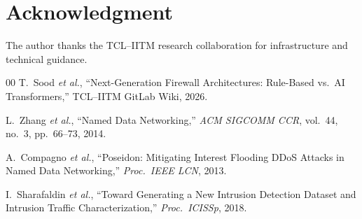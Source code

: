 \documentclass[conference]{IEEEtran}
\begin{document}
\section*{Acknowledgment}
The author thanks the TCL--IITM research collaboration for infrastructure and technical guidance.

\begin{thebibliography}{00}
T.~Sood \textit{et al.},
``Next-Generation Firewall Architectures: Rule-Based vs.\ AI Transformers,''
TCL--IITM GitLab Wiki, 2026.

L.~Zhang \textit{et al.},
``Named Data Networking,''
\emph{ACM SIGCOMM CCR}, vol.~44, no.~3, pp.~66--73, 2014.

A.~Compagno \textit{et al.},
``Poseidon: Mitigating Interest Flooding DDoS Attacks in Named Data Networking,''
\emph{Proc.\ IEEE LCN}, 2013.

I.~Sharafaldin \textit{et al.},
``Toward Generating a New Intrusion Detection Dataset and Intrusion Traffic Characterization,''
\emph{Proc.\ ICISSp}, 2018.
\end{thebibliography}
\end{document}
